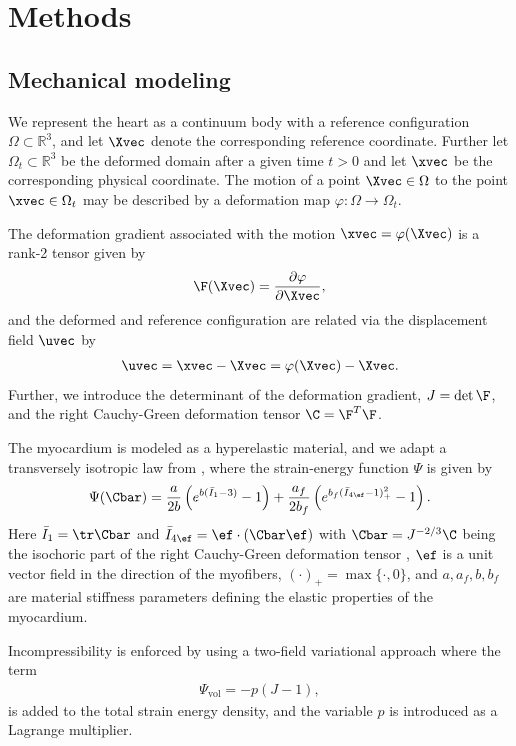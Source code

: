 \section{Methods}


\subsection{Mechanical modeling}
\label{sec:mechanical_modeling}
We represent the heart as a continuum body with a reference configuration 
$\Omega \subset \mathbb{R}^3$, and let $\Xvec$ denote the
corresponding reference coordinate. Further let $ \Omega_t
\subset \mathbb{R}^3$ be the deformed domain after a given time $t >
0$ and let $\xvec$ be the corresponding physical coordinate.  The
motion of a point $\Xvec \in  \Omega$ to the  point $\xvec \in
\Omega_t$ may be described by a deformation map  $\varphi :
\Omega  \rightarrow \Omega_t$. 

The deformation gradient associated with the motion $\xvec =
\varphi(\Xvec)$ is a rank-2 tensor given by 
\begin{align}
\F(\Xvec) = \frac{\partial \varphi}{\partial \Xvec},
\end{align}
and the deformed and reference configuration are related via the
displacement field  $\uvec$ by 
\begin{align}  
\uvec = \xvec-\Xvec = \varphi( \Xvec) -\Xvec.
\end{align}
Further, we introduce the determinant of the deformation gradient, $J =
\det \F$, and the right Cauchy-Green deformation tensor $\C = \F^T \F$.

The myocardium is modeled as a hyperelastic material, and we adapt a
transversely isotropic law from \cite{holzapfel2009constitutive},
where the strain-energy function $\Psi$ is given by  
\begin{align}
  \label{eq:hoa}
  \Psi(\Cbar) = \frac{a}{2 b} \left( e^{ b (\bar{I}_1  - 3)}  -1 \right)
  + \frac{a_f}{2 b_f} \left( e^{ b_f (\bar{I}_{4\ef} - 1)_+^2} -1 \right). 
\end{align}
Here $\bar{I}_1 = \tr \Cbar$ and $\bar{I}_{4\ef}= \ef \cdot (\Cbar
\ef)$ with $\Cbar = J^{-2/3}\C$ being the isochoric part of the right
Cauchy-Green deformation tensor , $\ef$ is a
unit vector field in the direction of the myofibers, $(\cdotp)_{+} 
= \max\{\cdot, 0\}$, and $a, a_f, b, b_f$ are 
material stiffness parameters defining the elastic properties of the
myocardium.

Incompressibility is enforced by using a two-field variational approach
where the term
\begin{align}
\Psi_{\text{vol}} = - p (J-1), 
\end{align}
is added to the total strain energy density, and the variable $p$ is
introduced as a Lagrange multiplier.

